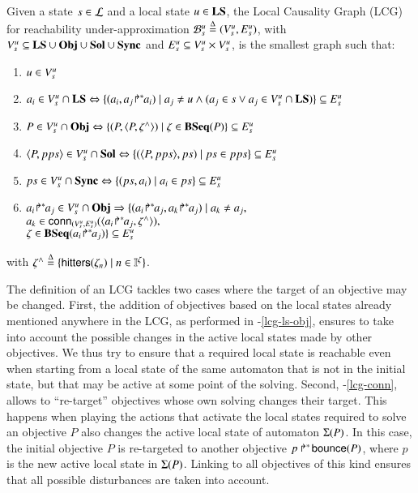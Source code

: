 \begin{definition}
\label{def:lcg}
Given a state $s \in \mathcal{L}$ and a local state $u\in \mathbf{LS}$,
the Local Causality Graph (LCG) for reachability under-approximation
${\mathcal{B}_{s}^{u}} \stackrel{\Delta}= ({V_s^u}, {E_s^u})$,
with
${V_s^u} \subseteq \mathbf{LS} \cup \mathbf{Obj} \cup \mathbf{Sol} \cup \mathbf{Sync}$
and
${E_s^u} \subseteq {V_s^u} \times {V_s^u}$,
is the smallest graph such that:
\begin{enumerate}
\item
$u \in {V_s^u}$
\item
$a_i\in{V_s^u}\cap\mathbf{LS} \Leftrightarrow \{ (a_i,{a_j\!\Rsh^*\!\!a_i}) \mid
a_j \neq u \wedge (a_j\in s \vee a_j\in{V_s^u}\cap\mathbf{LS})
\}\subseteq{E_s^u}$
\label{lcg-ls-obj}
\item
$P\in{V_s^u}\cap\mathbf{Obj} \Leftrightarrow 
	\{ (P,\langle P,\zeta^\wedge\rangle) \mid \zeta\in\mathbf{BSeq}(P) \}\subseteq{E_s^u}$
\label{lcg-obj-sol}
\item
$\langle P, pps \rangle\in{V_s^u}\cap\mathbf{Sol} \Leftrightarrow
	\{ (\langle P,pps\rangle, ps) \mid ps\in pps \}\subseteq{E_s^u}$
\label{lcg-sol-sync}
\item
$ps \in{V_s^u}\cap\mathbf{Sync} \Leftrightarrow
	\{ (ps, a_i) \mid a_i\in ps \}\subseteq{E_s^u}$
\label{lcg-sync-ls}
\item
$\obj{a_i}{a_j}\in \cwBNodes\cap\Obj \Rightarrow 
	\{(\obj{a_i}{a_j},\obj{a_k}{a_j}) \mid a_k\neq a_j,$
\label{lcg-conn}
\\
\hspace*{4cm}
$a_k\in \mathsf{conn}_{({V_s^u},{E_s^u})}(\langle{a_i\!\Rsh^*\!\!a_j},\zeta^\wedge\rangle),$
\\
\hspace*{4cm}
$\zeta\in\mathbf{BSeq}({a_i\!\Rsh^*\!\!a_j}) \}\subseteq{E_s^u}$
\end{enumerate}
with $\zeta^\wedge \stackrel{\Delta}= \{\mathsf{hitters}(\zeta_n) \mid n\in\mathbb{I}^{\zeta} \}$.
\end{definition}

The definition of an LCG tackles two cases
where the target of an objective may be changed.
First,
the addition of objectives based on the local states already mentioned anywhere in the LCG,
as performed in \nobreakdash-\ref{lcg-ls-obj},
ensures to take into account the possible changes in the active local states
made by other objectives.
We thus try to ensure that a required local state is reachable even when
starting from a local state of the same automaton that is not in the initial state,
but that may be active at some point of the solving.
Second, \nobreakdash-\ref{lcg-conn},
allows to “re-target” objectives whose own solving changes their target.
This happens when playing the actions that activate the local states required to solve
an objective $P$ also changes the active local state of automaton $\Sigma(P)$.
In this case, the initial objective $P$ is re-targeted to another
objective $\mbox{$p\Rsh^*\!\mathsf{bounce}(P)$}$, where $p$ is the new active local state in $\Sigma(P)$.
Linking to all objectives of this kind ensures that all possible disturbances
are taken into account.

